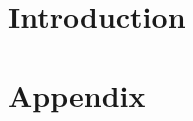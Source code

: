 \documentclass[11pt]{article}
\renewcommand{\thefootnote}{\fnsymbol{footnote}}
\theoremstyle{defn}
\begin{document}
\renewcommand*{\thefootnote}{\arabic{footnote}}

\section{Introduction}
\label{introduction}


\newpage
\clearpage




\newpage

\section*{Appendix}
\label{appendix}

\end{document}

